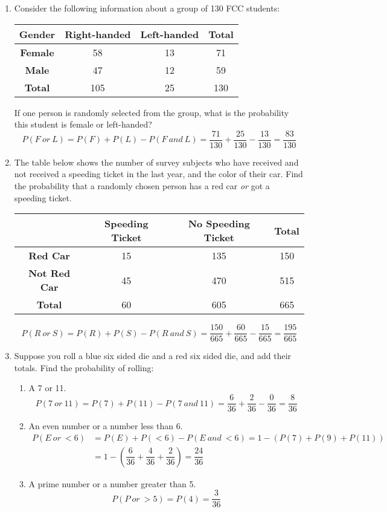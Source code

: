 \begin{enumerate}
\item Consider the following information about a group of 130 FCC students:
\begin{center}
\begin{tabular}{c | c c | c}
\textbf{Gender} & \textbf{Right-handed} & \textbf{Left-handed} & \textbf{Total} \\ \hline 
\textbf{Female} & 58 & 13 & 71\\
\textbf{Male} & 47 & 12 & 59  \\ \hline
\textbf{Total} & 105 & 25 & 130 
\end{tabular}
\end{center}
If one person is randomly selected from the group, what is the probability this student is female or left-handed? 
\[P(F\ or\ L) = P(F) + P(L) - P(F\ and\ L) = \dfrac{71}{130} + \dfrac{25}{130} - \dfrac{13}{130} = \dfrac{83}{130}\]

\item The table below shows the number of survey subjects who have received and not received a speeding ticket in the last year, and the color of their car. Find the probability that a randomly chosen person has a red car \emph{or} got a speeding ticket. 
\begin{center}
\begin{tabular}{c | c c | c}
& \textbf{Speeding Ticket} & \textbf{No Speeding Ticket }& \textbf{Total} \\ \hline 
\textbf{Red Car} & 15 & 135 & 150\\
\textbf{Not Red Car} & 45 & 470 & 515  \\ \hline
\textbf{Total} & 60 & 605 & 665
\end{tabular}
\end{center} \text{} 
\[P(R\ or\ S) = P(R) + P(S) - P(R\ and\ S) = \dfrac{150}{665} + \dfrac{60}{665} - \dfrac{15}{665} = \dfrac{195}{665}\]

\item Suppose you roll a blue six sided die and a red six sided die, and add their totals.
Find the probability of rolling:
\begin{enumerate}
\item A 7 or 11. 
\[P(7\ or\ 11) = P(7) + P(11) - P(7\ and\ 11) = \dfrac{6}{36} + \dfrac{2}{36} - \dfrac{0}{36} = \dfrac{8}{36}\]
\item An even number or a number less than 6. 
\begin{align*}
P(E\ or\ <6) &= P(E) + P(<6) - P(E\ and\ <6) = 1 - (P(7) + P(9) + P(11))\\
&= 1 - \left(\dfrac{6}{36} + \dfrac{4}{36} + \dfrac{2}{36}\right) = \dfrac{24}{36}
\end{align*}
\item A prime number or a number greater than 5. 
\[P(P\ or\ >5) = P(4) = \dfrac{3}{36}\]
\end{enumerate}


\end{enumerate}
